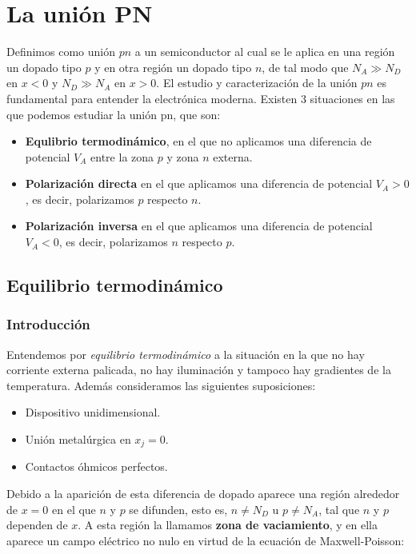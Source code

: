 \chapter{La unión PN}

Definimos como unión $pn$ a un semiconductor al cual se le aplica en una región un dopado tipo $p$ y en otra región un dopado tipo $n$, de tal modo que $N_A \gg N_D$ en $x<0$ y $N_D \gg N_A$ en $x>0$. El estudio y caracterización de la unión $pn$ es fundamental para entender la electrónica moderna. Existen 3 situaciones en las que podemos estudiar la unión pn, que son:

\begin{itemize}
    \item \textbf{Equlibrio termodinámico}, en el que no aplicamos una diferencia de potencial $V_A$ entre la  zona $p$ y zona $n$ externa.
    \item \textbf{Polarización directa} en el que aplicamos una diferencia de potencial $V_A>0$, es decir, polarizamos $p$ respecto $n$.
    \item \textbf{Polarización inversa} en el que aplicamos una diferencia de potencial $V_A<0$, es decir, polarizamos $n$ respecto $p$.
\end{itemize} 

\section{Equilibrio termodinámico}

\subsection{Introducción}

Entendemos por \textit{equilibrio termodinámico} a la situación en la que no hay corriente externa palicada, no hay iluminación y tampoco hay gradientes de la temperatura. Además consideramos las siguientes suposiciones:

\begin{itemize}
    \item Dispositivo unidimensional.
    \item Unión metalúrgica en $x_j=0$. 
    \item Contactos óhmicos perfectos.
\end{itemize} 
Debido a la aparición de esta diferencia de dopado aparece una región alrededor de $x=0$ en el que $n$ y $p$ se difunden, esto es, $n\neq N_D$ u $p\neq N_A$, tal que $n$ y $p$ dependen de $x$. A esta región la llamamos \textbf{zona de vaciamiento}, y en ella aparece un campo eléctrico no nulo en virtud de la ecuación de Maxwell-Poisson:

